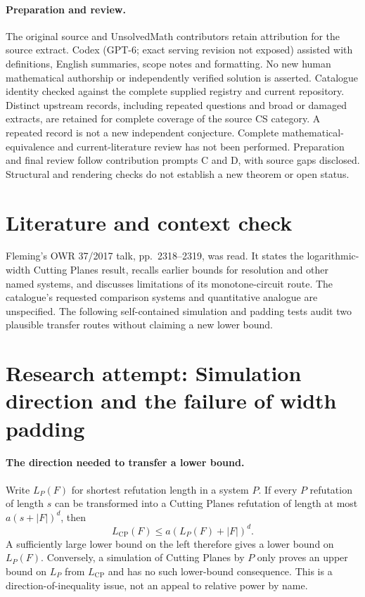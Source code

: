 \documentclass[11pt]{article}
\begin{document}
\paragraph{Preparation and review.}
The original source and UnsolvedMath contributors retain attribution for the source extract. Codex (GPT-6; exact serving revision not exposed) assisted with definitions, English summaries, scope notes and formatting. No new human mathematical authorship or independently verified solution is asserted. Catalogue identity checked against the complete supplied registry and current repository. Distinct upstream records, including repeated questions and broad or damaged extracts, are retained for complete coverage of the source CS category. A repeated record is not a new independent conjecture. Complete mathematical-equivalence and current-literature review has not been performed. Preparation and final review follow contribution prompts C and D, with source gaps disclosed. Structural and rendering checks do not establish a new theorem or open status.
\label{end:statement}

\section{Literature and context check}
Fleming's OWR 37/2017 talk, pp.~2318--2319, was read. It states the logarithmic-width Cutting Planes result, recalls earlier bounds for resolution and other named systems, and discusses limitations of its monotone-circuit route. The catalogue's requested comparison systems and quantitative analogue are unspecified. The following self-contained simulation and padding tests audit two plausible transfer routes without claiming a new lower bound.
\section{Research attempt: Simulation direction and the failure of width padding}

\paragraph{The direction needed to transfer a lower bound.}
Write $L_P(F)$ for shortest refutation length in a system $P$. If every $P$ refutation of length $s$ can be transformed into a Cutting Planes refutation of length at most $a(s+|F|)^d$, then
\[
 L_{\mathrm{CP}}(F)\le a(L_P(F)+|F|)^d.
\]
A sufficiently large lower bound on the left therefore gives a lower bound on $L_P(F)$. Conversely, a simulation of Cutting Planes by $P$ only proves an upper bound on $L_P$ from $L_{\mathrm{CP}}$ and has no such lower-bound consequence. This is a direction-of-inequality issue, not an appeal to relative power by name.
\end{document}
